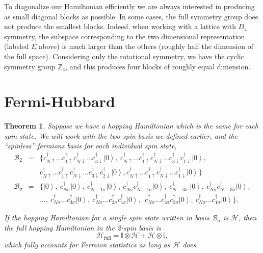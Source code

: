 \documentclass{article}
\newcommand{\ket}[1]{\left| #1 \right>} %
\newtheorem{theorem}{Theorem}[section]
\theoremstyle{definition}
\begin{document}
To diagonalize our Hamiltonian efficiently we are always interested in producing as small diagonal blocks as possible. In some cases, the full symmetry group does not produce the smallest blocks. Indeed, when working with a lattice with $D_4$ symmetry, the subspace corresponding to the two dimensional representation (labeled $E$ above) is much larger than the others (roughly half the dimension of the full space). Considering only the rotational symmetry, we have the cyclic symmetry group $\mathbb{Z}_4$, and this produces four blocks of roughly equal dimension.

\section{Fermi-Hubbard}

\begin{theorem}
Suppose we have a hopping Hamiltonian which is the same for each spin state. We will work with the two-spin basis we defined earlier, and the ``spinless'' fermions basis for each individual spin state,
\begin{eqnarray*}
\mathcal{B}_2 &=& \{ c^\dag_{N\uparrow}...c^\dag_{1\uparrow}c^\dag_{N\downarrow}...c^\dag_{3\downarrow} \ket{0},\ c^\dag_{N\uparrow}...c^\dag_{1\uparrow}c^\dag_{N\downarrow}...c^\dag_{3\downarrow} c^\dag_{1\downarrow} \ket{0}, \nonumber \\
&& c^\dag_{N\uparrow}...c^\dag_{1\uparrow}c^\dag_{N\downarrow}...c^\dag_{3\downarrow}c^\dag_{2\downarrow} \ket{0}, c^\dag_{N\uparrow}...c^\dag_{1\uparrow}c^\dag_{N\downarrow}...c^\dag_{1\downarrow} \ket{0} \} \nonumber\\
\mathcal{B}_\sigma &=& \{\ket{0}, \ c^\dag_{N\sigma} \ket{0}, \ c^\dag_{N-1\sigma} \ket{0}, \ c^\dag_{N\sigma} c^\dag_{N-1\sigma} \ket{0}, \ c^\dag_{N-3\sigma}\ \ket{0}, \ c^\dag_{N\sigma} c^\dag_{N-3\sigma} \ket{0} ,\\
&& ...,\ c^\dag_{N\sigma}...c^\dag_{3\sigma} \ket{0}, \ c^\dag_{N\sigma}...c^\dag_{3\sigma} c^\dag_{1\sigma} \ket{0},\ \ c^\dag_{N\sigma}...c^\dag_{3\sigma} c^\dag_{2\sigma} \ket{0}, \ c^\dag_{N\sigma}...c^\dag_{1\sigma} \ket{0}\} \nonumber.
\end{eqnarray*}

If the hopping Hamiltonian for a single spin state written in basis $\mathcal{B}_\sigma$ is $\mathcal{H}$, then the full hopping Hamiltonian in the 2-spin basis is
\begin{equation}
\mathcal{H}_\text{full} = \mathbb{I} \otimes \mathcal{H} + \mathcal{H} \otimes \mathbb{I},
\end{equation}
which fully accounts for Fermion statistics as long as $\mathcal{H}$ does.


\end{theorem}
\end{document}
